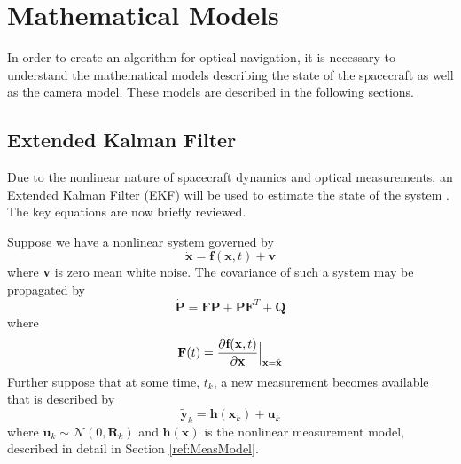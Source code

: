 \documentclass[]{aiaa-tc}%
\begin{document}

\section{Mathematical Models}
In order to create an algorithm for optical navigation, it is necessary to understand the mathematical models describing the state of the spacecraft as well as the camera model.  These models are described in the following sections.


\subsection{Extended Kalman Filter}
Due to the nonlinear nature of spacecraft dynamics and optical measurements, an Extended Kalman Filter (EKF) will be used to estimate the state of the system \cite{Gelb,KalmanFiltering}.  The key equations are now briefly reviewed.

Suppose we have a nonlinear system governed by 
%
\begin{equation}
\label{eq:F}
\dot{\textbf{x}}=\textbf{f}(\textbf{x},t)+\textbf{v}
\end{equation}
%
where \textbf{v} is zero mean white noise.  The covariance of such a system may be propagated by 
%
\begin{equation}
\label{eq:Pdot}
\dot{\textbf{P}}=\textbf{F}\textbf{P}+\textbf{P}\textbf{F}^T+\textbf{Q}
\end{equation}
%
where 
%
\begin{equation}
\label{eq:F}
\textbf{F}(t)=\frac{\partial{\textbf{f}(\textbf{x},t)}}{\partial{\textbf{x}}}\Big{|}_{\textbf{x}=\hat{\textbf{x}}}
\end{equation}
%
Further suppose that at some time, $t_{k}$, a new measurement becomes available that is described by 
%
\begin{equation}
\label{eq:ymeas}
\tilde{\textbf{y}}_k=\textbf{h}(\textbf{x}_k)+\textbf{u}_k
\end{equation}
%
where $\textbf{u}_k \sim \mathcal{N}(0,\textbf{R}_k)$ and $\textbf{h}(\textbf{x})$ is the nonlinear measurement model, described in detail in Section \ref{ref:MeasModel}.
%
%
\end{document}
